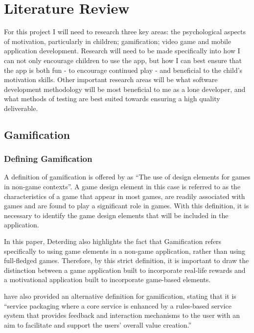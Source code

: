 \chapter{Literature Review}
\label{chap:litReview}

For this project I will need to research three key areas: the psychological aspects of motivation, particularly in children; gamification; video game and mobile application development.
Research will need to be made specifically into how I can not only encourage children to use the app, but how I can best ensure that the app is both fun - to encourage continued play - and beneficial to the child's motivation skills.
Other important research areas will be what software development methodology will be most beneficial to me as a lone developer, and what methods of testing are best suited towards ensuring a high quality deliverable.

\section{Gamification}
\subsection{Defining Gamification}
A definition of gamification is offered by \citet[p.6]{Deterding:2011:GDE:2181037.2181040} as ``The use of design elements for games in non-game contexts''. 
A game design element in this case is referred to as the characteristics of a game that appear in most games, are readily associated with games and are found to play a significant role in games.
With this definition, it is necessary to identify the game design elements that will be included in the application. 

In this paper, Deterding also highlights the fact that Gamification refers specifically to using game elements in a non-game application, rather than using full-fledged games.
Therefore, by this strict definition, it is important to draw the distinction between a game application built to incorporate real-life rewards and a motivational application built to incorporate game-based elements.

\citet[p.5]{huotari2011gamification} have also provided an alternative definition for gamification, stating that it is ``service packaging where a core service is enhanced by a rules-based service system that provides feedback and interaction mechanisms to the user with an aim to facilitate and support the users’ overall value creation.''

